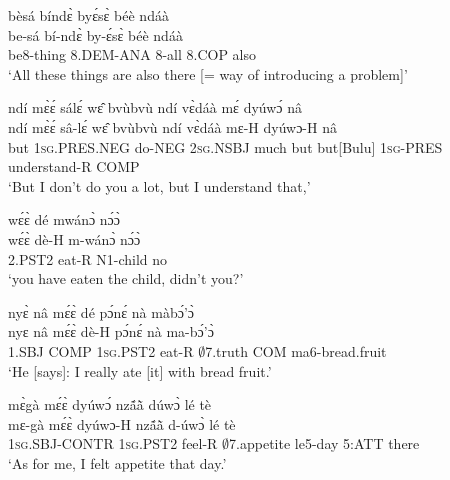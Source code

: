 \begin{exe} 
\exN\label{123}
  \glll bèsá bíndɛ̀ byɛ́sɛ̀ béè ndáà \\
        be-sá bí-ndɛ̀ by-ɛ́sɛ̀ béè ndáà \\
        be8-thing 8.DEM-ANA 8-all 8.COP also \\
    \trans `All these things are also there [= way of introducing a problem]'
\end{exe}

\begin{exe} 
\exN\label{124}
  \glll ndí mɛ̀ɛ́ sálɛ́ wɛ̂ bvùbvù ndí vɛ̀dáà mɛ́ dyúwɔ́ nâ \\
        ndí mɛ̀ɛ́ sâ-lɛ́ wɛ̂ bvùbvù ndí vɛ̀dáà mɛ-H dyúwɔ-H nâ \\
       but 1\textsc{sg}.PRES.NEG do-NEG 2\textsc{sg}.NSBJ much but but[Bulu] 1\textsc{sg}-PRES understand-R COMP   \\
    \trans `But I don't do you a lot, but I understand that,'
\end{exe}

\begin{exe} 
\exN\label{125}
  \glll wɛ́ɛ̀ dé mwánɔ̀ nɔ́ɔ̀ \\
       wɛ́ɛ̀ dè-H m-wánɔ̀ nɔ́ɔ̀ \\
      2.PST2 eat-R N1-child no \\
    \trans `you  have eaten %
     the child, didn't you?'
\end{exe}

\begin{exe} 
\exN\label{126}
  \glll nyɛ̀ nâ mɛ́ɛ̀ dé pɔ́nɛ́ nà màbɔ́'ɔ̀ \\
        nyɛ nâ mɛ́ɛ̀ dè-H pɔ́nɛ́ nà ma-bɔ́'ɔ̀ \\
      1.SBJ COMP 1\textsc{sg}.PST2 eat-R $\emptyset$7.truth COM ma6-bread.fruit   \\
    \trans `He [says]: I really ate [it] with bread fruit.'
\end{exe}

\begin{exe} 
\exN\label{127} 
  \glll mɛ̀gà mɛ́ɛ̀ dyúwɔ́ nzã́ã̀ dúwɔ̀ lé tè \\
       mɛ-gà mɛ́ɛ̀ dyúwɔ-H nzã́ã̀ d-úwɔ̀ lé tè \\
         1\textsc{sg}.SBJ-CONTR 1\textsc{sg}.PST2 feel-R $\emptyset$7.appetite le5-day 5:ATT there \\
    \trans `As for me, I felt appetite that day.'
\end{exe}

